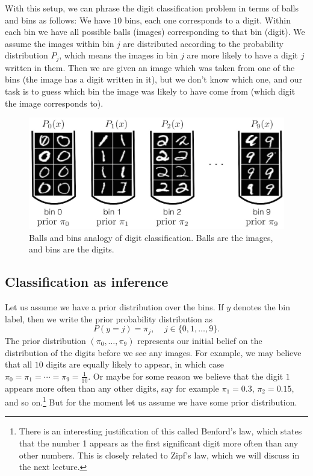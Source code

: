 \documentclass[11pt]{article}
\begin{document}
With this setup, we can phrase the digit classification problem in terms of balls and bins as follows: We have $10$ bins, each one corresponds to a digit. Within each bin we have all possible balls (images) corresponding to that bin (digit). We assume the images within bin $j$ are distributed according to the probability distribution $P_j$, which means the images in bin $j$ are more likely to have a digit $j$ written in them. Then we are given an image which was taken from one of the bins (the image has a digit written in it), but we don't know which one, and our task is to guess which bin the image was likely to have come from (which digit the image corresponds to).

\begin{figure}[h!]
\centering
\includegraphics[scale=0.25]{ballsbins}
\caption{Balls and bins analogy of digit classification. Balls are the images, and bins are the digits.}
\label{fig:ballsbins}
\end{figure}



\subsection*{Classification as inference}

Let us assume we have a prior distribution over the bins. If $y$ denotes the bin label, then we write the prior probability distribution as
$$P(y = j) = \pi_j, ~~~~~ j \in \{0,1,\dots,9\}.$$
The prior distribution $(\pi_0,\dots,\pi_9)$ represents our initial belief on the distribution of the digits before we see any images. For example, we may believe that all $10$ digits are equally likely to appear, in which case $\pi_0 = \pi_1 = \cdots = \pi_9 = \frac{1}{10}$. Or maybe for some reason we believe that the digit $1$ appears more often than any other digits, say for example $\pi_1 = 0.3$, $\pi_2 = 0.15$, and so on.\footnote{There is an interesting justification of this called Benford's law, which states that the number 1 appears as the first significant digit more often than any other numbers. This is closely related to Zipf's law, which we will discuss in the next lecture.} But for the moment let us assume we have some prior distribution.
\end{document}
